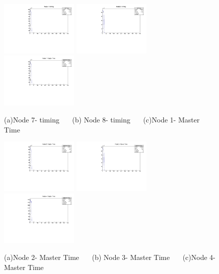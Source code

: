 \documentclass[a4paper,11pt]{article}
\theoremstyle{mytheor}
\begin{document}
\begin{figure}[H] 
\vspace*{-0.3cm} 
\includegraphics[width=0.33\textwidth,scale=0.5,trim=0 0 0 0,clip]{plotsdir/file0_test-N7Time-1.pdf} 
\includegraphics[width=0.33\textwidth,scale=0.5,trim=0 0 0 0,clip]{plotsdir/file0_test-N8Time-1.pdf} 
\includegraphics[width=0.33\textwidth,scale=0.5,trim=0 0 0 0,clip]{plotsdir/file0_test-N1MasterTime-1.pdf} 
\caption{(a)Node 7- timing ~~~(b) Node 8- timing ~~~(c)Node 1- Master Time } 
\end{figure} 
\begin{figure}[H] 
\vspace*{-0.3cm} 
\includegraphics[width=0.33\textwidth,scale=0.5,trim=0 0 0 0,clip]{plotsdir/file0_test-N2MasterTime-1.pdf} 
\includegraphics[width=0.33\textwidth,scale=0.5,trim=0 0 0 0,clip]{plotsdir/file0_test-N3MasterTime-1.pdf} 
\includegraphics[width=0.33\textwidth,scale=0.5,trim=0 0 0 0,clip]{plotsdir/file0_test-N4MasterTime-1.pdf} 
\caption{(a)Node 2- Master Time ~~~(b) Node 3- Master Time ~~~(c)Node 4- Master Time } 
\end{figure} 
\end{document}
